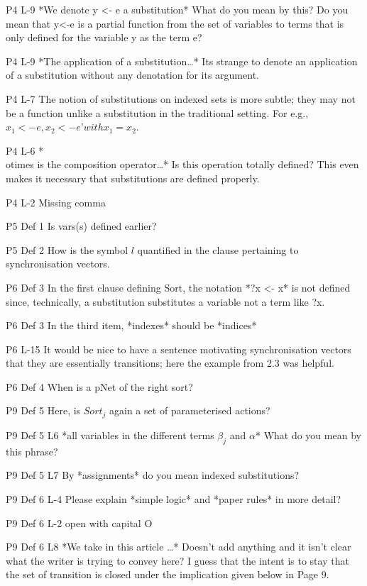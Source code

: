 \documentclass{article}
\begin{document}
P4 L-9 *We denote y <- e a substitution* What do you mean by this? Do you mean that y<-e is a partial function from the set of variables to terms that is only defined for the variable y as the term e?

P4 L-9 *The application of a substitution…* Its strange to denote an application of a substitution without any denotation for its argument.


P4 L-7 The notion of substitutions on indexed sets is more subtle; they may not be a function unlike a substitution in the traditional setting. For e.g., $x_1 <-e, x_2 <-e’ with x_1 = x_2$.

P4 L-6 *\\otimes is the composition operator…* Is this operation totally defined? This even makes it necessary that substitutions are defined properly.

P4 L-2 Missing comma

P5 Def 1 Is vars(s) defined earlier?

P5 Def 2 How is the symbol $l$ quantified in the clause pertaining to synchronisation vectors.

P6 Def 3 In the first clause defining Sort, the notation *?x <- x* is not defined since, technically, a substitution substitutes a variable not a term like ?x.

P6 Def 3 In the third item, *indexes* should be *indices*

P6 L-15 It would be nice to have a sentence motivating synchronisation vectors that they are essentially transitions; here the example from 2.3 was helpful.

P6 Def 4 When is a pNet of the right sort?

P9 Def 5 Here, is $Sort_j$ again a set of parameterised actions?

P9 Def 5 L6 *all variables in the different terms $\beta_j$ and $\alpha$* What do you mean by this phrase?

P9 Def 5 L7 By *assignments* do you mean indexed substitutions?

P9 Def 6 L-4 Please explain *simple logic* and *paper rules* in more detail?

P9 Def 6 L-2 open with capital O

P9 Def 6 L8 *We take in this article …* Doesn’t add anything and it isn’t clear what the writer is trying to convey here? I guess that the intent is to stay that the set of transition is closed under the implication given below in Page 9.
\end{document}
